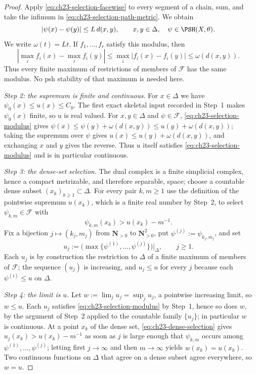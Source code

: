 \begin{proof}
Apply \eqref{eq:ch23-selection-facewise} to every segment of a chain, sum,
and take the infimum in \eqref{eq:ch23-selection-path-metric}.  We obtain
\begin{equation}\label{eq:ch23-selection-modulus}
 |\psi(x)-\psi(y)|\leq L\,d(x,y),
 \qquad x,y\in\Delta,
 \quad \psi\in\PSH(X,\theta).
\end{equation}
We write $\omega(t)=Lt$.  If $f_1,\ldots,f_r$ satisfy this modulus, then
\[
 |\max_i f_i(x)-\max_i f_i(y)|
 \leq\max_i|f_i(x)-f_i(y)|
 \leq\omega(d(x,y)).
\]
Thus every finite maximum of restrictions of members of $\mathcal F$ has
the same modulus.  No psh stability of that maximum is needed here.

\emph{Step 2: the supremum is finite and continuous.}
For $x\in\Delta$ we have
$\psi_0(x)\leq u(x)\leq C_0$.  The first exact skeletal input recorded in
Step~1 makes $\psi_0(x)$ finite, so $u$ is real valued.  For
$x,y\in\Delta$ and $\psi\in\mathcal F$,
\eqref{eq:ch23-selection-modulus} gives
$\psi(x)\leq\psi(y)+\omega(d(x,y))\leq u(y)+\omega(d(x,y))$; taking the
supremum over $\psi$ gives $u(x)\leq u(y)+\omega(d(x,y))$, and
exchanging $x$ and $y$ gives the reverse.  Thus $u$ itself satisfies
\eqref{eq:ch23-selection-modulus} and is in particular continuous.

\emph{Step 3: the dense-set selection.}
The dual complex is a finite simplicial complex, hence a compact metrizable,
and therefore separable, space; choose a countable dense subset
$(x_k)_{k\geq1}\subset\Delta$.  For every pair $k,m\geq1$ use the
definition of the pointwise supremum $u(x_k)$, which is a finite real
number by Step~2, to select $\psi_{k,m}\in\mathcal F$ with
\begin{equation}\label{eq:ch23-dense-selection}
                     \psi_{k,m}(x_k)>u(x_k)-m^{-1}.
\end{equation}
Fix a bijection $j\mapsto(k_j,m_j)$ from $\mathbf N_{>0}$ to
$\mathbf N_{>0}^2$, put $\psi^{(j)}:=\psi_{k_j,m_j}$, and set
\begin{equation}\label{eq:ch23-selection-finite-maxima}
 u_j:=\bigl(\max\{\psi^{(1)},\ldots,\psi^{(j)}\}\bigr)\big|_\Delta,
 \qquad j\geq1 .
\end{equation}
Each $u_j$ is by construction the restriction to $\Delta$ of a finite
maximum of members of $\mathcal F$; the sequence $(u_j)$ is increasing,
and $u_j\leq u$ for every $j$ because each $\psi^{(i)}\leq u$ on
$\Delta$.

\emph{Step 4: the limit is $u$.}
Let $w:=\lim_ju_j=\sup_ju_j$, a pointwise increasing limit, so
$w\leq u$.  Each $u_j$ satisfies \eqref{eq:ch23-selection-modulus} by
Step~1, hence so does $w$, by the argument of Step~2 applied to the
countable family $\{u_j\}$; in particular $w$ is continuous.  At a point
$x_k$ of the dense set, \eqref{eq:ch23-dense-selection} gives
$u_j(x_k)>u(x_k)-m^{-1}$ as soon as $j$ is large enough that
$\psi_{k,m}$ occurs among $\psi^{(1)},\ldots,\psi^{(j)}$; letting first
$j\to\infty$ and then $m\to\infty$ yields $w(x_k)=u(x_k)$.  Two
continuous functions on $\Delta$ that agree on a dense subset agree
everywhere, so $w=u$.


\end{proof}

